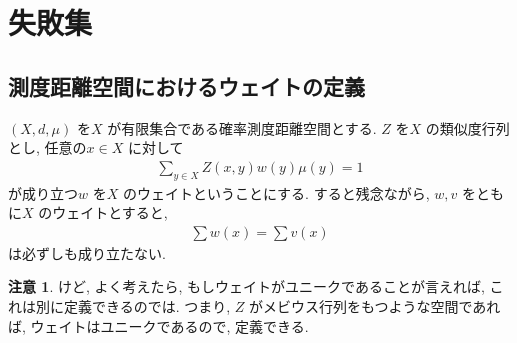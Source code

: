 \documentclass[10pt, fleqn, label-section=none]{bxjsarticle}
\theoremstyle{definition}
\newtheorem{remark}[dfn]{注意}
\renewcommand{\;}{\, ; \,}
\begin{document}
\section{失敗集}

\subsection{測度距離空間におけるウェイトの定義}

$(X, d, \mu)$ を$X$ が有限集合である確率測度距離空間とする. $Z$ を$X$ の類似度行列とし, 任意の$x \in X$ に対して
\begin{align*} \sum_{y \in X} Z(x, y)w(y)\mu(y) = 1 \end{align*}
が成り立つ$w$ を$X$ のウェイトということにする. すると残念ながら, 
$w, v$ をともに$X$ のウェイトとすると, 
\begin{align*} \sum w(x) = \sum v(x) \end{align*}
は必ずしも成り立たない. 

\begin{remark}
けど, よく考えたら, もしウェイトがユニークであることが言えれば, これは別に定義できるのでは. つまり, $Z$ がメビウス行列をもつような空間であれば, ウェイトはユニークであるので, 定義できる. 
\end{remark}
\end{document}
